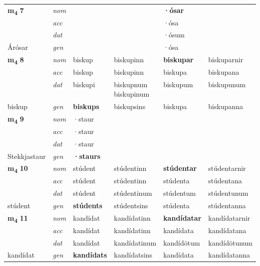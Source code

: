 \begin{longtable}[l]{X>{\footnotesize\itshape}XXXXX}
\multirow{3}{*}{{{\textbf{m{\textsubscript{4}}} \Large{\textbf{7}}}}}  
 & nom &  &     & \textbf{·ósar} &   \\*
 & acc &   &    & ·ósa  &  \\*
 & dat &  &    & ·ósum &  \\*
 {\footnotesize{Árósar}} &  gen & \textbf{}  &   & ·ósa &  \\
\cmidrule{1-6}


\multirow{3}{*}{{{\textbf{m{\textsubscript{4}}} \Large{\textbf{8}}}}}  
 & nom & biskup & biskupinn    & \textbf{biskupar} & biskuparnir  \\*
 & acc & biskup  & biskupinn   & biskupa  & biskupana \\*
 & dat & biskupi & \specialcell{biskupnum\\ biskupinum}   & biskupum & biskupunum \\*
 {\footnotesize{biskup}} &  gen & \textbf{biskups}  & biskupsins  & biskupa & biskupanna \\
\cmidrule{1-6}


\multirow{3}{*}{{{\textbf{m{\textsubscript{4}}} \Large{\textbf{9}}}}}  
 & nom & ·staur &     & \textbf{} &   \\*
 & acc & ·staur  &    &   &  \\*
 & dat & ·staur &    &  &  \\*
 {\footnotesize{Stekkjastaur}} &  gen & \textbf{·staurs}  &   &  &  \\
\cmidrule{1-6}


\multirow{3}{*}{{{\textbf{m{\textsubscript{4}}} \Large{\textbf{10}}}}}  
 & nom & stúdent & stúdentinn    & \textbf{stúdentar} & stúdentarnir  \\*
 & acc & stúdent  & stúdentinn   & stúdenta  & stúdentana \\*
 & dat & stúdent & stúdentinum   & stúdentum & stúdentunum \\*
 {\footnotesize{stúdent}} &  gen & \textbf{stúdents}  & stúdentsins  & stúdenta & stúdentanna \\
\cmidrule{1-6}


\multirow{3}{*}{{{\textbf{m{\textsubscript{4}}} \Large{\textbf{11}}}}}  
 & nom & kandídat & kandídatinn    & \textbf{kandídatar} & kandídatarnir  \\*
 & acc & kandídat  & kandídatinn   & kandídata  & kandídatana \\*
 & dat & kandídat & kandídatinum   & kandídötum & kandídötunum \\*
 {\footnotesize{kandídat}} &  gen & \textbf{kandídats}  & kandídatsins  & kandídata & kandídatanna \\
\cmidrule{1-6}



\end{longtable}
